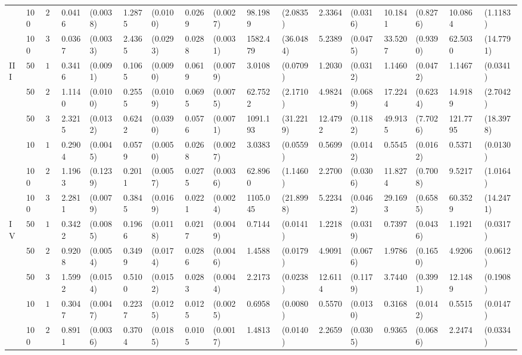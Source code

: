 \begin{table}[H]
\begin{footnotesize}
\begin{tabular}{lllllllllllllllll}
    &  100 & $20$ & 0.0416 & (0.0038) & 1.2875 & (0.0100) & 0.0269 & (0.0027) & 98.1989 & (2.0835) & 2.3364 & (0.0316) & 10.1841 & (0.8276) & 10.0864 & (1.1183) \\ 
    &  100 & $30$ & 0.0367 & (0.0033) & 2.4365 & (0.0293) & 0.0288 & (0.0031) & 1582.479 & (36.0484) & 5.2389 & (0.0475) & 33.5207 & (0.9390) & 62.5030 & (14.7791) \\ 
  III & $50$ & $10$ & 0.3416 & (0.0091) & 0.1065 & (0.0090) & 0.0619 & (0.0079) & 3.0108 & (0.0709) & 1.2030 & (0.0312) & 1.1460 & (0.0472) & 1.1467 & (0.0341) \\ 
    &  50 & $20$ & 1.1140 & (0.0100) & 0.2555 & (0.0109) & 0.0695 & (0.0075) & 62.7522 & (2.1710) & 4.9824 & (0.0689) & 17.2244 & (0.6234) & 14.9189 & (2.7042) \\ 
    &  50 & $30$ & 2.3215 & (0.0132) & 0.6242 & (0.0390) & 0.0576 & (0.0071) & 1091.193 & (31.2219) & 12.4792 & (0.1182) & 49.9135 & (7.7026) & 121.7795 & (18.3978) \\ 
    & $100$ & $10$ & 0.2904 & (0.0045) & 0.0579 & (0.0050) & 0.0268 & (0.0027) & 3.0383 & (0.0559) & 0.5699 & (0.0142) & 0.5545 & (0.0162) & 0.5371 & (0.0130) \\ 
    &  100 & $20$ & 1.1963 & (0.1239) & 0.2011 & (0.0057) & 0.0275 & (0.0036) & 62.8960 & (1.1460) & 2.2700 & (0.0306) & 11.8274 & (0.7008) & 9.5217 & (1.0164) \\ 
    & 100  & $30$ & 2.2811 & (0.0079) & 0.3845 & (0.0169) & 0.0221 & (0.0024) & 1105.045 & (21.8998) & 5.2234 & (0.0462) & 29.1693 & (0.6585) & 60.3529 & (14.2471) \\ 
  IV & $50$ & $10$ & 0.3422 & (0.0085) & 0.1966 & (0.0118) & 0.0217 & (0.0049) & 0.7144 & (0.0141) & 1.2218 & (0.0319) & 0.7397 & (0.0436) & 1.1921 & (0.0317) \\ 
    & 50  & $20$ & 0.9208 & (0.0054) & 0.3499 & (0.0174) & 0.0286 & (0.0046) & 1.4588 & (0.0179) & 4.9091 & (0.0676) & 1.9786 & (0.1650) & 4.9206 & (0.0612) \\ 
    &  50 & $30$ & 1.5992 & (0.0154) & 0.5100 & (0.0152) & 0.0283 & (0.0044) & 2.2173 & (0.0238) & 12.6114 & (0.1179) & 3.7440 & (0.3991) & 12.1489 & (0.1908) \\ 
    & $100$ & $10$ & 0.3047 & (0.0047) & 0.2237 & (0.0125) & 0.0125 & (0.0025) & 0.6958 & (0.0080) & 0.5570 & (0.0130) & 0.3168 & (0.0142) & 0.5515 & (0.0147) \\ 
    &  100 & $20$ & 0.8911 & (0.0036) & 0.3704 & (0.0185) & 0.0105 & (0.0017) & 1.4813 & (0.0140) & 2.2659 & (0.0305) & 0.9365 & (0.0686) & 2.2474 & (0.0334) \\ 

\end{tabular}
\end{footnotesize}
\end{table}
